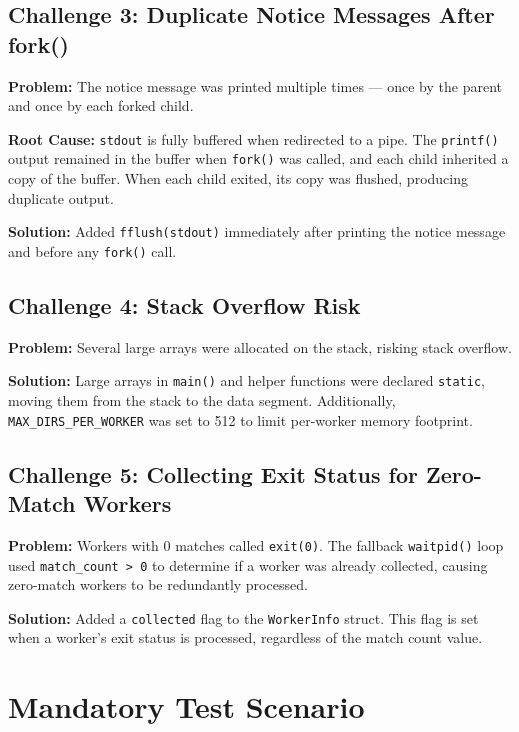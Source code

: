 \documentclass[12pt,a4paper]{article}
\begin{document}
\subsection{Challenge 3: Duplicate Notice Messages After fork()}

\textbf{Problem:} The notice message was printed multiple times --- once by the parent and once by each forked child.

\textbf{Root Cause:} \texttt{stdout} is fully buffered when redirected to a pipe. The \texttt{printf()} output remained in the buffer when \texttt{fork()} was called, and each child inherited a copy of the buffer. When each child exited, its copy was flushed, producing duplicate output.

\textbf{Solution:} Added \texttt{fflush(stdout)} immediately after printing the notice message and before any \texttt{fork()} call.

\subsection{Challenge 4: Stack Overflow Risk}

\textbf{Problem:} Several large arrays were allocated on the stack, risking stack overflow.

\textbf{Solution:} Large arrays in \texttt{main()} and helper functions were declared \texttt{static}, moving them from the stack to the data segment. Additionally, \texttt{MAX\_DIRS\_PER\_WORKER} was set to 512 to limit per-worker memory footprint.

\subsection{Challenge 5: Collecting Exit Status for Zero-Match Workers}

\textbf{Problem:} Workers with 0 matches called \texttt{exit(0)}. The fallback \texttt{waitpid()} loop used \texttt{match\_count > 0} to determine if a worker was already collected, causing zero-match workers to be redundantly processed.

\textbf{Solution:} Added a \texttt{collected} flag to the \texttt{WorkerInfo} struct. This flag is set when a worker's exit status is processed, regardless of the match count value.

\section{Mandatory Test Scenario}
\end{document}
